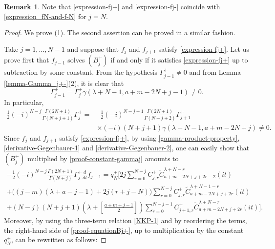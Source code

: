 \documentclass[12pt, pdflatex, a4paper]{article}
\theoremstyle{plain}
\theoremstyle{definition}
\newtheorem{rem}[thm]{Remark}
\def\Geg{\widetilde{C}}
\begin{document}
\begin{rem}
Note that \eqref{expression-fj+} and \eqref{expression-fj-}
coincide with \eqref{expression_fN-and-f-N} for $j = N$.
\end{rem}
\begin{proof}
We prove (1). The second assertion can be proved in a similar fashion. 

Take $j = 1, \ldots, N-1$ and suppose that $f_j$ and $f_{j+1}$ satisfy \eqref{expression-fj+}. Let us prove first that $f_{j-1}$ solves $(B_{j}^+)$ if and only if it satisfies \eqref{expression-fj+} up to subtraction by some constant. From the hypothesis $\Gamma_{j-1}^+ \neq 0$ and from Lemma \ref{lemma-Gamma_j+-}(2), it is clear that 
\begin{equation}\label{proof-constant-hypothesis}
\Gamma_{j-1}^+ = \Gamma_j^+ \gamma(\lambda+N-1, a+m-2N+j-1) \neq 0.
\end{equation}
In particular,
\begin{equation}\label{proof-constant-gammaj}
\begin{aligned}
\frac{1}{2}(-i)^{N-j}\frac{\Gamma(2N+1)}{\Gamma(N+j+1)}\Gamma_{j}^+ = & \enspace \frac{1}{2}(-i)^{N-j-1}\frac{\Gamma(2N+1)}{\Gamma(N+j+2)}\Gamma_{j+1}^+\\
& \times (-i)(N+j+1)\gamma(\lambda + N-1, a+m-2N+j) \neq 0.
\end{aligned}
\end{equation}
Since $f_j$ and $f_{j+1}$ satisfy \eqref{expression-fj+}, by using \eqref{gamma-product-property}, \eqref{derivative-Gegenbauer-1} and \eqref{derivative-Gegenbauer-2}, one can easily show that $(B_j^+)$ multiplied by \eqref{proof-constant-gammaj} amounts to
\begin{equation}\label{proof-equationBj+}
\begin{aligned}
-\frac{1}{2}(-i)^{N-j}\frac{\Gamma(2N+1)}{\Gamma(N+j)}\Gamma_{j}^+\frac{d}{dt}f_{j-1} = q_N^+\Big[2j\sum_{r=0}^{N-j}C_{j, r}^+\Geg_{a+m-2N+j+2r-2}^{\lambda+N-r}(it)\\
+\big((j-m)(\lambda + a-j-1)+2j(r+j-N)\big)\sum_{r=0}^{N-j} C_{j, r}^+\Geg_{a+m-2N+j+2r}^{\lambda+N-1-r}(it)\\
+ (N-j)(N+j+1)\left(\lambda+ \left[\frac{a+m+j-1}{2}\right]\right)\sum_{r=0}^{N-j-1}C_{j+1, r}^+\Geg_{a+m-2N+j+2r}^{\lambda+N-r}(it)\Big].
\end{aligned}
\end{equation}
Moreover, by using the three-term relation \eqref{KKP-1} and by reordering the terms, the right-hand side of \eqref{proof-equationBj+}, up to multiplication by the constant $q_N^+$, can be rewritten as follows:

\end{proof}
\end{document}
